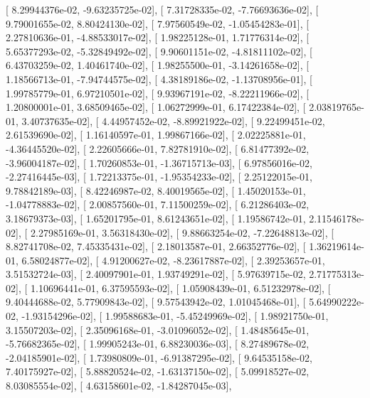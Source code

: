 \documentclass{article}
\begin{document}
       [  8.29944376e-02,  -9.63235725e-02],
       [  7.31728335e-02,  -7.76693636e-02],
       [  9.79001655e-02,   8.80424130e-02],
       [  7.97560549e-02,  -1.05454283e-01],
       [  2.27810636e-01,  -4.88533017e-02],
       [  1.98225128e-01,   1.71776314e-02],
       [  5.65377293e-02,  -5.32849492e-02],
       [  9.90601151e-02,  -4.81811102e-02],
       [  6.43703259e-02,   1.40461740e-02],
       [  1.98255500e-01,  -3.14261658e-02],
       [  1.18566713e-01,  -7.94744575e-02],
       [  4.38189186e-02,  -1.13708956e-01],
       [  1.99785779e-01,   6.97210501e-02],
       [  9.93967191e-02,  -8.22211966e-02],
       [  1.20800001e-01,   3.68509465e-02],
       [  1.06272999e-01,   6.17422384e-02],
       [  2.03819765e-01,   3.40737635e-02],
       [  4.44957452e-02,  -8.89921922e-02],
       [  9.22499451e-02,   2.61539690e-02],
       [  1.16140597e-01,   1.99867166e-02],
       [  2.02225881e-01,  -4.36445520e-02],
       [  2.22605666e-01,   7.82781910e-02],
       [  6.81477392e-02,  -3.96004187e-02],
       [  1.70260853e-01,  -1.36715713e-03],
       [  6.97856016e-02,  -2.27416445e-03],
       [  1.72213375e-01,  -1.95354233e-02],
       [  2.25122015e-01,   9.78842189e-03],
       [  8.42246987e-02,   8.40019565e-02],
       [  1.45020153e-01,  -1.04778883e-02],
       [  2.00857560e-01,   7.11500259e-02],
       [  6.21286403e-02,   3.18679373e-03],
       [  1.65201795e-01,   8.61243651e-02],
       [  1.19586742e-01,   2.11546178e-02],
       [  2.27985169e-01,   3.56318430e-02],
       [  9.88663254e-02,  -7.22648813e-02],
       [  8.82741708e-02,   7.45335431e-02],
       [  2.18013587e-01,   2.66352776e-02],
       [  1.36219614e-01,   6.58024877e-02],
       [  4.91200627e-02,  -8.23617887e-02],
       [  2.39253657e-01,   3.51532724e-03],
       [  2.40097901e-01,   1.93749291e-02],
       [  5.97639715e-02,   2.71775313e-02],
       [  1.10696441e-01,   6.37595593e-02],
       [  1.05908439e-01,   6.51232978e-02],
       [  9.40444688e-02,   5.77909843e-02],
       [  9.57543942e-02,   1.01045468e-01],
       [  5.64990222e-02,  -1.93154296e-02],
       [  1.99588683e-01,  -5.45249969e-02],
       [  1.98921750e-01,   3.15507203e-02],
       [  2.35096168e-01,  -3.01096052e-02],
       [  1.48485645e-01,  -5.76682365e-02],
       [  1.99905243e-01,   6.88230036e-03],
       [  8.27489678e-02,  -2.04185901e-02],
       [  1.73980809e-01,  -6.91387295e-02],
       [  9.64535158e-02,   7.40175927e-02],
       [  5.88820524e-02,  -1.63137150e-02],
       [  5.09918527e-02,   8.03085554e-02],
       [  4.63158601e-02,  -1.84287045e-03],
\end{document}
